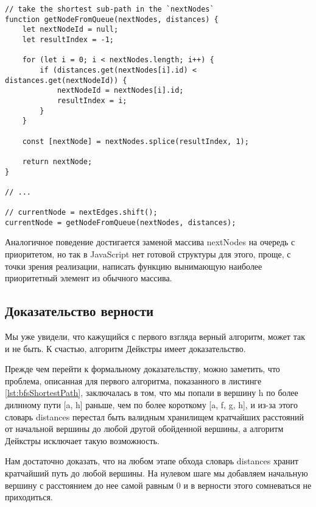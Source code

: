 \documentclass[../article.tex]{subfiles}
\begin{document}
\begin{figure*}
    \begin{ruledelement}
        \begin{lstlisting}[caption={Отличие алгоритма дейкстры}, label={lst:dijkstraDiffBfs}]
// take the shortest sub-path in the `nextNodes`
function getNodeFromQueue(nextNodes, distances) {
    let nextNodeId = null;
    let resultIndex = -1;

    for (let i = 0; i < nextNodes.length; i++) {
        if (distances.get(nextNodes[i].id) < distances.get(nextNodeId)) {
            nextNodeId = nextNodes[i].id;
            resultIndex = i;
        }
    }

    const [nextNode] = nextNodes.splice(resultIndex, 1);

    return nextNode;
}

// ...

// currentNode = nextEdges.shift();
currentNode = getNodeFromQueue(nextNodes, distances);
        \end{lstlisting}
    \end{ruledelement}
\end{figure*}

Аналогичное поведение достигается заменой массива nextNodes на очередь с приоритетом, но так в JavaScript нет готовой структуры для этого, проще, с точки зрения реализации, написать функцию вынимающую наиболее приоритетный элемент из обычного массива.

\subsection{Доказательство верности}

Мы уже увидели, что кажущийся с первого взгляда верный алгоритм, может так и не быть. К счастью, алгоритм Дейкстры имеет доказательство.

Прежде чем перейти к формальному доказательству, можно заметить, что проблема, описанная для первого алгоритма, показанного в листинге \ref{lst:bfsShortestPath}, заключалась в том, что мы попали в вершину h по более дилнному пути [a, h] раньше, чем по более короткому [a, f, g, h], и из-за этого словарь distances перестал быть валидным хранилищем кратчайших расстояний от начальной вершины до любой другой обойденной вершины, а алгоритм Дейкстры исключает такую возможность.

Нам достаточно доказать, что на любом этапе обхода словарь distances хранит кратчайший путь до любой вершины. На нулевом шаге мы добавляем начальную вершину с расстоянием до нее самой равным 0 и в верности этого сомневаться не приходиться.
\end{document}

